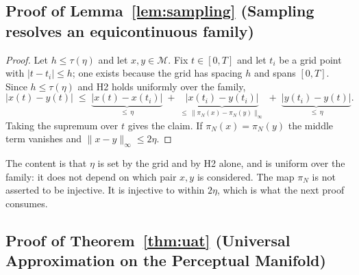 \documentclass[10pt]{article}
\theoremstyle{plain}
\theoremstyle{definition}
\theoremstyle{remark}
\begin{document}
\subsection{Proof of Lemma~\ref{lem:sampling} (Sampling resolves an equicontinuous family)}

\begin{proof}
Let $h \le \tau(\eta)$ and let $x,y \in \mathcal{M}$. Fix $t \in [0,T]$ and let
$t_i$ be a grid point with $|t - t_i| \le h$; one exists because the grid has
spacing $h$ and spans $[0,T]$. Since $h \le \tau(\eta)$ and H2 holds uniformly
over the family,
\[
|x(t) - y(t)| \;\le\; \underbrace{|x(t) - x(t_i)|}_{\le\, \eta}
 \;+\; \underbrace{|x(t_i) - y(t_i)|}_{\le\, \|\pi_N(x)-\pi_N(y)\|_\infty}
 \;+\; \underbrace{|y(t_i) - y(t)|}_{\le\, \eta}.
\]
Taking the supremum over $t$ gives the claim. If $\pi_N(x) = \pi_N(y)$ the
middle term vanishes and $\|x-y\|_\infty \le 2\eta$.
\end{proof}

\noindent The content is that $\eta$ is set by the grid and by H2 alone, and is
uniform over the family: it does not depend on which pair $x,y$ is considered.
The map $\pi_N$ is not asserted to be injective. It is injective to within
$2\eta$, which is what the next proof consumes.

\subsection{Proof of Theorem~\ref{thm:uat} (Universal Approximation on the Perceptual Manifold)}
\end{document}
